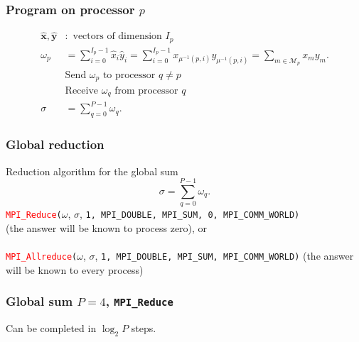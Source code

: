 \begin{frame}
  \frametitle{Program on processor $p$}
  \begin{align*}
    \hat{\bm x}, \hat{\bm y} &: \text{ vectors of dimension } I_p \\
    \omega_p &= \sum_{i=0}^{I_p-1} \hat{x}_i \hat{y}_i
    = \sum_{i=0}^{I_p-1} x_{\mu^{-1}(p,i)} y_{\mu^{-1}(p,i)}
    = \sum_{m \in \mathcal{M}_p} x_m y_m. \\
                 & \text{Send } \omega_p  \text{ to processor } q \not= p \\
                 & \text{Receive } \omega_q  \text{ from processor } q \\
    \sigma &= \sum_{q=0}^{P-1} \omega_q.
  \end{align*}
\end{frame}

\begin{frame}
  \frametitle{Global reduction}
  Reduction algorithm for the global sum
  \[
    \sigma = \sum_{q=0}^{P-1} \omega_q.
  \]
  \texttt{\textcolor{red}{MPI\_Reduce}(}$\omega$, $\sigma$,
  \texttt{1, MPI\_DOUBLE, MPI\_SUM, 0, MPI\_COMM\_WORLD)} \\
  (the answer will be known to process zero), or \\~\\
  \texttt{\textcolor{red}{MPI\_Allreduce}(}$\omega$, $\sigma$,
  \texttt{1, MPI\_DOUBLE, MPI\_SUM, MPI\_COMM\_WORLD)}
  (the answer will be known to every process)
\end{frame}

\begin{frame}
  \frametitle{Global sum $P=4$, \texttt{MPI\_Reduce}}
  \begin{center}
  \end{center}
  Can be completed in $\log_2 P$ steps.
\end{frame}

